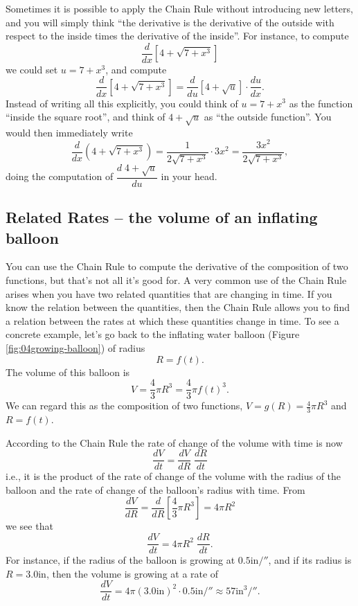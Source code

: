 Sometimes it is possible to apply the Chain Rule without introducing
new letters, and you will simply think ``the derivative is the
derivative of the outside with respect to the inside times the
derivative of the inside''.  For instance, to compute
\[
\frac{d}{dx}\left[4+\sqrt{7+x^3} \right]
\]
we could set $u=7+x^3$, and compute
\[
  \frac{d}{dx} \left[4+\sqrt{7+x^3} \right]
=\frac{d}{du}\left[4+\sqrt u\right] \cdot \frac{du}{dx} .
\]
Instead of writing all this explicitly, you could think of $u=7+x^3$
as the function ``inside the square root'', and think of $4+\sqrt u$
as ``the outside function''. You would then immediately write
\[
\frac{d}{dx}(4+\sqrt{7+x^3})
= \frac{1}{2\sqrt{7+x^3}}\cdot 3x^2
=\frac{3x^2}{2\sqrt{7+x^3}},
\]
doing the computation of $\dfrac{d\;4+\sqrt u} {du}$ in your head.








\subsection{Related Rates -- the volume of an inflating balloon} 
You can use the Chain Rule to compute the derivative of the composition of two
functions, but that's not all it's good for.  A very common use of the Chain
Rule arises when you have two related quantities that are changing in time.  If
you know the relation between the quantities, then the Chain Rule allows you to
find a relation between the rates at which these quantities change in time.  To
see a concrete example, let's go back to the inflating water balloon (Figure
\ref{fig:04growing-balloon}) of radius
\[
R=f(t).
\]
The volume of this balloon is
\[
V=\frac43\pi R^3 = \frac43\pi f(t)^3.
\]
We can regard this as the composition of two functions,  $V=g(R) = \frac43\pi
R^3$ and $R= f(t)$.




According to the Chain Rule the rate of change of the volume with time is now
\[
\frac{dV}{dt} = \frac{dV}{dR}\;\frac{dR}{dt}
\]
i.e., it is the product of the rate of change of the volume with the radius of
the balloon and the rate of change of the balloon's radius with time.  From
\[
\frac{dV}{dR} = \frac{d}{dR}\left[\frac43\pi R^3\right] = 4\pi R^2
\]
we see that
\[
\frac{dV}{dt} =  4\pi R^2 \;\frac{dR}{dt}.
\]
For instance, if the radius of the balloon is growing at
$0.5\mathrm{in}/\second$, and if its radius is $R=3.0\mathrm{in}$,
then the volume is growing at a rate of
\[
\frac{dV}{dt} = 4\pi(3.0\mathrm{in})^2\cdot 0.5\mathrm{in}/\second
\approx 57 \mathrm{in}^3/\second.
\]




